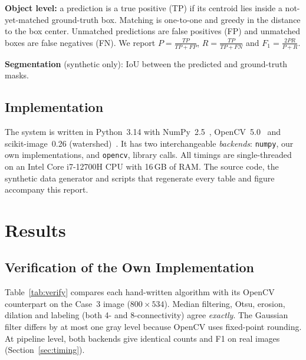\documentclass[conference,a4paper]{IEEEtran}
\newcommand{\cfg}[1]{\texttt{#1}}
\begin{document}
\textbf{Object level:} a prediction is a true positive (TP) if its centroid lies inside a not-yet-matched ground-truth box. Matching is one-to-one and greedy in the distance to the box center. Unmatched predictions are false positives (FP) and unmatched boxes are false negatives (FN). We report $P=\frac{TP}{TP+FP}$, $R=\frac{TP}{TP+FN}$ and $F_1=\frac{2PR}{P+R}$.

\textbf{Segmentation} (synthetic only): IoU between the predicted and ground-truth masks.

\subsection{Implementation}
The system is written in Python~3.14 with NumPy~2.5~\cite{harris2020numpy}, OpenCV~5.0~\cite{bradski2000opencv} and scikit-image~0.26 (watershed)~\cite{vanderwalt2014}. It has two interchangeable \emph{backends}: \cfg{numpy}, our own implementations, and \cfg{opencv}, library calls. All timings are single-threaded on an Intel Core i7-12700H CPU with 16\,GB of RAM. The source code, the synthetic data generator and scripts that regenerate every table and figure accompany this report.

\section{Results}
\subsection{Verification of the Own Implementation}\label{sec:verify}
Table~\ref{tab:verify} compares each hand-written algorithm with its OpenCV counterpart on the Case~3 image ($800\times534$). Median filtering, Otsu, erosion, dilation and labeling (both 4- and 8-connectivity) agree \emph{exactly}. The Gaussian filter differs by at most one gray level because OpenCV uses fixed-point rounding. At pipeline level, both backends give identical counts and F1 on real images (Section~\ref{sec:timing}).
\end{document}
